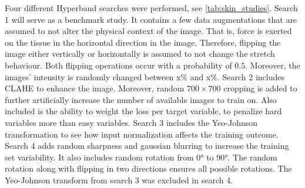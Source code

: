 Four different Hyperband searches were performed, see \cref{tab:skin_studies}.
Search 1 will serve as a benchmark study.
It contains a few data augmentations that are assumed to not alter the physical context of the image.
That is, force is exerted on the tissue in the horizontal direction in the image.
Therefore, flipping the image either vertically or horizontally is assumed to not change the stretch behaviour.
Both flipping operations occur with a probability of $0.5$.
Moreover, the images' intensity is randomly changed between x\% and x\%.
Search 2 includes CLAHE to enhance the image.
Moreover, random $700\times700$ cropping is added to further artificially increase the number of available images to train on.
Also included is the ability to weight the loss per target variable, to penalize hard variables more than easy variables.
Search 3 includes the Yeo-Johnson transformation to see how input normalization affects the training outcome.
Search 4 adds random sharpness and gaussian blurring to increase the training set variability.
It also includes random rotation from \ang{0} to \ang{90}.
The random rotation along with flipping in two directions ensures all possible rotations.
The Yeo-Johnson transform from search 3 was excluded in search 4.

